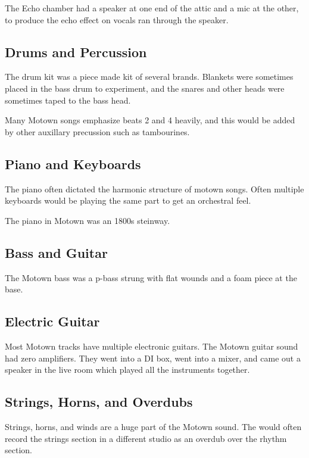 \documentclass[12pt, a4paper, twoside, openright, titlepage]{book}
\begin{document}
The Echo chamber had a speaker at one end of the attic and a mic at the other, to produce the echo effect on vocals ran through the speaker.


\subsection{Drums and Percussion}

The drum kit was a piece made kit of several brands. Blankets were sometimes placed in the bass drum to experiment, and the snares and other heads were sometimes taped to the bass head. 

Many Motown songs emphasize beats 2 and 4 heavily, and this would be added by other auxillary precussion such as tambourines.


\subsection{Piano and Keyboards}

The piano often dictated the harmonic structure of motown songs. Often multiple keyboards would be playing the same part to get an orchestral feel. 

The piano in Motown was an 1800s steinway. 

\subsection{Bass and Guitar}

The Motown bass was a p-bass strung with flat wounds and a foam piece at the base. 


\subsection{Electric Guitar}

Most Motown tracks have multiple electronic guitars. The Motown guitar sound had zero amplifiers. They went into a DI box, went into a mixer, and came out a speaker in the live room which played all the instruments together.


\subsection{Strings, Horns, and Overdubs}

Strings, horns, and winds are a huge part of the Motown sound. The would often record the strings section in a different studio as an overdub over the rhythm section.
\end{document}

